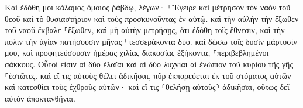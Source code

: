 \documentclass{openreader}
\begin{document}
Καὶ ἐδόθη μοι κάλαμος ὅμοιος ῥάβδῳ, λέγων· ⸀Ἔγειρε καὶ μέτρησον τὸν ναὸν τοῦ θεοῦ καὶ τὸ θυσιαστήριον καὶ τοὺς προσκυνοῦντας ἐν αὐτῷ. 
καὶ τὴν αὐλὴν τὴν ἔξωθεν τοῦ ναοῦ ἔκβαλε ⸀ἔξωθεν, καὶ μὴ αὐτὴν μετρήσῃς, ὅτι ἐδόθη τοῖς ἔθνεσιν, καὶ τὴν πόλιν τὴν ἁγίαν πατήσουσιν μῆνας ⸀τεσσεράκοντα δύο. 
καὶ δώσω τοῖς δυσὶν μάρτυσίν μου, καὶ προφητεύσουσιν ἡμέρας χιλίας διακοσίας ἑξήκοντα, ⸀περιβεβλημένοι σάκκους. 
Οὗτοί εἰσιν αἱ δύο ἐλαῖαι καὶ αἱ δύο λυχνίαι αἱ ἐνώπιον τοῦ κυρίου τῆς γῆς ⸀ἑστῶτες. 
καὶ εἴ τις αὐτοὺς θέλει ἀδικῆσαι, πῦρ ἐκπορεύεται ἐκ τοῦ στόματος αὐτῶν καὶ κατεσθίει τοὺς ἐχθροὺς αὐτῶν· καὶ εἴ τις ⸂θελήσῃ αὐτοὺς⸃ ἀδικῆσαι, οὕτως δεῖ αὐτὸν ἀποκτανθῆναι. 
\end{document}
